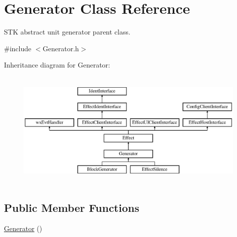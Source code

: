 \hypertarget{class_generator}{}\section{Generator Class Reference}
\label{class_generator}


S\+TK abstract unit generator parent class.  




{\ttfamily \#include $<$Generator.\+h$>$}

Inheritance diagram for Generator\+:\begin{figure}[H]
\begin{center}
\leavevmode
\includegraphics[height=5.753425cm]{class_generator}
\end{center}
\end{figure}
\subsection*{Public Member Functions}
\begin{DoxyCompactItemize}
\item 
\hyperlink{class_generator_aaaf1e5f3a47ede3ef8a96a301ee04a10}{Generator} ()
\end{DoxyCompactItemize}
